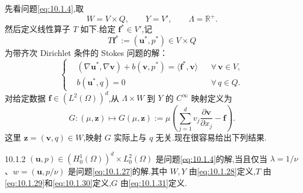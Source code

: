 先看问题\eqref{eq:10.1.4},取
\begin{equation}\label{eq:10.1.28}
  W=V\times Q,\qquad Y=V',\qquad \Lambda=\mathbb R^+.
\end{equation}
然后定义线性算子 \(T\) 如下.给定 \(\boldsymbol{f}^*\in V'\),记
\begin{equation}\label{eq:10.1.29}
  T\boldsymbol{f}^*:=(\boldsymbol{u}^*,p^*)\in V\times Q
\end{equation}
为带齐次 Dirichlet 条件的 Stokes 问题的解：
\begin{equation}\label{eq:10.1.30}
  \left\{
  \begin{aligned}
    &(\nabla\boldsymbol{u}^*,\nabla\boldsymbol{v})+b(\boldsymbol{v},p^*)
        =\langle\boldsymbol{f}^*,\boldsymbol{v}\rangle&&\forall\,\boldsymbol{v}\in V,\\
    &b(\boldsymbol{u}^*,q)=0&&\forall\,q\in Q.
  \end{aligned}
  \right.
\end{equation}
对给定数据 \(\boldsymbol{f}\in(L^2(\Omega))^d\),从 \(\Lambda\times W\) 到 \(Y\) 的 \(C^\infty\) 映射定义为
\begin{equation}\label{eq:10.1.31}
  G\colon(\mu,\boldsymbol{z})\mapsto G(\mu,\boldsymbol{z})
     :=\mu\left(\sum_{j=1}^d v_j\frac{\partial\boldsymbol{v}}{\partial x_j}-\boldsymbol{f}\right).
\end{equation}
这里 \(\boldsymbol{z}=(\boldsymbol{v},q)\in W\),映射 \(G\) 实际上与 \(q\) 无关.现在很容易给出下列结果.

\begin{lemma}[]{10.1.2}
\((\boldsymbol{u},p)\in(H_0^1(\Omega))^d\times L_0^2(\Omega)\) 是问题\eqref{eq:10.1.4}的解,当且仅当 \(\lambda=1/\nu\)、\(w=(\boldsymbol{u},p/\nu)\) 是问题\eqref{eq:10.1.27}的解.其中 \(W,Y\) 由\eqref{eq:10.1.28}定义,\(T\) 由\eqref{eq:10.1.29}和\eqref{eq:10.1.30}定义,\(G\) 由\eqref{eq:10.1.31}定义.
\end{lemma}

